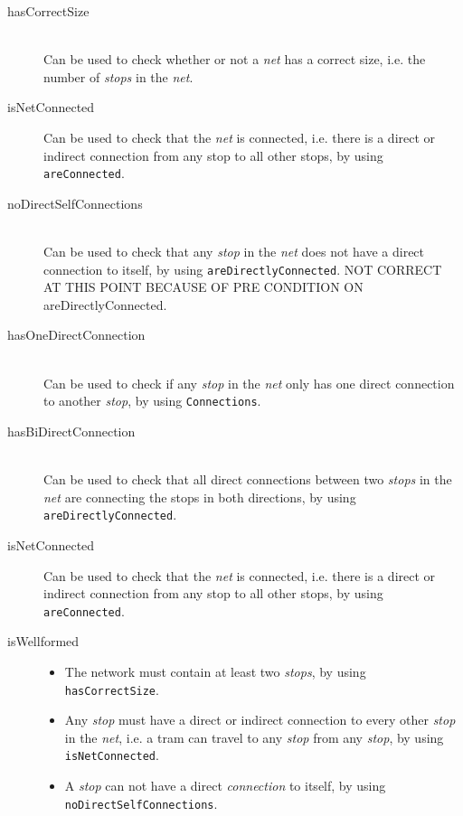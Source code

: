 \documentclass[a4]{article}
\begin{document}
\begin{description}
    \item[hasCorrectSize] \hfill \\ Can be used to check whether or not a \emph{net} has a correct size, i.e. the number of \emph{stops} in the \emph{net}.
    \item[isNetConnected] Can be used to check that the \emph{net} is connected, i.e. there is a direct or indirect connection from any stop to all other stops, by using \verb=areConnected=.
    \item[noDirectSelfConnections] \hfill \\ Can be used to check that any \emph{stop} in the \emph{net} does not have a direct connection to itself, by using \verb=areDirectlyConnected=. NOT CORRECT AT THIS POINT BECAUSE OF PRE CONDITION ON areDirectlyConnected.
    \item[hasOneDirectConnection] \hfill \\ Can be used to check if any \emph{stop} in the \emph{net} only has one direct connection to another \emph{stop}, by using \verb=Connections=.
    \item[hasBiDirectConnection] \hfill \\ Can be used to check that all direct connections between two \emph{stops} in the \emph{net} are connecting the stops in both directions, by using \verb=areDirectlyConnected=.
    \item[isNetConnected] Can be used to check that the \emph{net} is connected, i.e. there is a direct or indirect connection from any stop to all other stops, by using \verb=areConnected=.
    \item[isWellformed] \hfill
        \begin{itemize}
            \item The network must contain at least two \emph{stops}, by using \verb=hasCorrectSize=.
            \item Any \emph{stop} must have a direct or indirect connection to every other \emph{stop} in the \emph{net}, i.e. a tram can travel to any \emph{stop} from any \emph{stop}, by using \verb=isNetConnected=.
            \item A \emph{stop} can not have a direct \emph{connection} to itself, by using \verb=noDirectSelfConnections=.

\end{itemize}
\end{description}
\end{document}
